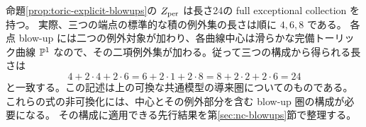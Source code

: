 命題\ref{prop:toric-explicit-blowups}の $Z_{\rm per}$ は長さ24の full exceptional collection を持つ。
実際、三つの端点の標準的な積の例外集の長さは順に $4,6,8$ である。
各点 blow-up には二つの例外対象が加わり、各曲線中心は滑らかな完備トーリック曲線
$\mathbb P^1$ なので、その二項例外集が加わる。従って三つの構成から得られる長さは
\[
 4+2\cdot4+2\cdot6
 =6+2\cdot1+2\cdot8
 =8+2\cdot2+2\cdot6=24
\]
と一致する。この記述は上の可換な共通模型の導来圏についてのものである。
これらの式の非可換化には、中心とその例外部分を含む blow-up 圏の構成が必要になる。
その構成に適用できる先行結果を第\ref{sec:nc-blowups}節で整理する。
